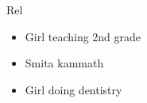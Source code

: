\begin{frame}
\begin{columns}
\begin{column}{0.20\linewidth}
\begin{block}{Rel}
\begin{itemize}
\small \item Girl teaching 2nd grade 

  \item \small Smita kammath 

      \item \small Girl doing dentistry

  \end{itemize} 
\end{block} 
\end{column}%
\end{columns}

\end{frame}






